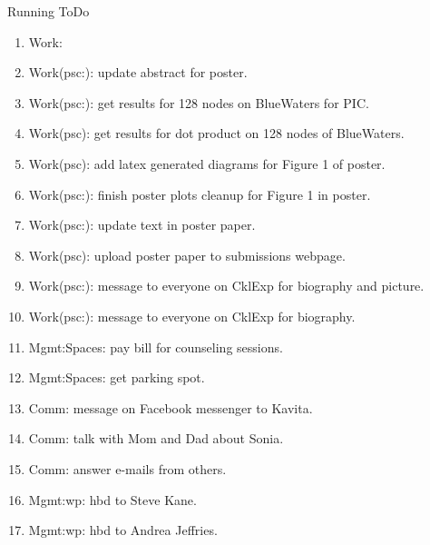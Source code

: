 \begin{columns}
\begin{column}{0.6\linewidth}
\begin{block}{Running ToDo}
\begin{enumerate}

     \item \tiny Work: 

     \item \tiny Work(psc:): update abstract for poster. 
     \item \tiny Work(psc:): get results for 128 nodes on BlueWaters
       for PIC. 

     \item \tiny Work(psc): get results for dot product on 128 nodes
       of BlueWaters.


     \item \tiny Work(psc): add latex generated diagrams for Figure
         1 of poster. 
     \item \tiny Work(psc:): finish poster plots cleanup for Figure 1
       in poster. 

     \item \tiny Work(psc:): update text in poster paper.

       \item \tiny Work(psc): upload poster paper to submissions
         webpage. 

     \item \tiny Work(psc:):  message to everyone on CklExp for
       biography and picture.

     \item \tiny Work(psc:):  message to everyone on CklExp for
       biography. 

     \item \tiny Mgmt:Spaces: pay bill for counseling sessions. 
     \item \tiny Mgmt:Spaces: get parking spot. 

     \item \tiny Comm: message on Facebook messenger to Kavita. 

     \item \tiny Comm: talk with Mom and Dad about Sonia.
       
     \item \tiny Comm: answer e-mails from others. 

     \item \tiny Mgmt:wp: hbd to Steve Kane. 
     \item \tiny Mgmt:wp: hbd to Andrea Jeffries. 


\end{enumerate}
\end{block}
\end{column}
\end{columns}

